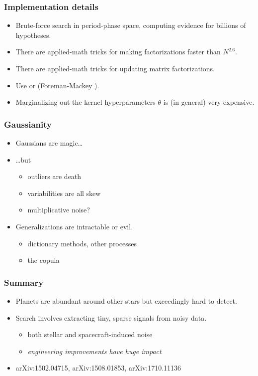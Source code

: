 \documentclass[pdftex]{beamer}
\newcommand{\conclusions}{%
\begin{frame}
  \frametitle{Summary}
  \begin{itemize}
  \item Planets are abundant around other stars but exceedingly hard to detect.
  \item Search involves extracting tiny, sparse signals from noisy data.
    \begin{itemize}
    \item both stellar and spacecraft-induced noise
    \item \emph{engineering improvements have huge impact}
    \end{itemize}
  \item arXiv:1502.04715, arXiv:1508.01853, arXiv:1710.11136
  \end{itemize}
\end{frame}}
\begin{document}
\begin{frame}
  \frametitle{Implementation details}
  \begin{itemize}
  \item Brute-force search in period-phase space, computing evidence for billions of hypotheses.
  \item There are applied-math tricks for making factorizations faster than $N^{2.6}$.
  \item There are applied-math tricks for updating matrix factorizations.
  \item Use  or  {\footnotesize (Foreman-Mackey \etal)}.
  \item Marginalizing out the kernel hyperparameters $\theta$ is (in general) very expensive.
  \end{itemize}
\end{frame}

\begin{frame}
  \frametitle{Gaussianity}
  \begin{itemize}
  \item Gaussians are magic\ldots
  \item \ldots but
    \begin{itemize}
    \item outliers are death
    \item variabilities are all skew
    \item multiplicative noise?
    \end{itemize}
  \item Generalizations are intractable or evil.
    \begin{itemize}
    \item dictionary methods, other processes
    \item the copula
    \end{itemize}
  \end{itemize}
\end{frame}

\conclusions
\end{document}
